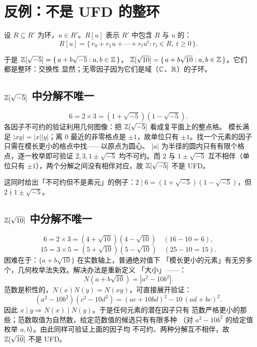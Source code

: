 \section{反例：不是 UFD 的整环}\label{sec:counter}

\begin{definition}[{环的生成 $R[u]$}]
设 $R\subseteq R'$ 为环，$u\in R'$。$R[u]$ 表示 $R'$ 中包含 $R$ 与 $u$
的：
\[
  R[u] = \{\, r_0 + r_1 u + \cdots + r_t u^t : r_i\in R,\ t\ge 0\,\}.
\]
\end{definition}

于是 $\mathbb{Z}[\sqrt{-5}] = \{\,a+b\sqrt{-5} : a,b\in\mathbb{Z}\,\}$，
$\mathbb{Z}[\sqrt{10}] = \{\,a+b\sqrt{10} : a,b\in\mathbb{Z}\,\}$。它们都是整环：交换性
显然；无零因子因为它们是域（$\mathbb{C}$、$\mathbb{R}$）的子环。

\subsection{\texorpdfstring{$\Z[\sqrt{-5}]$}{Z[√-5]} 中分解不唯一}

\begin{example}[{$\Z[\sqrt{-5}]$ 中分解不唯一}]
\[
  6 = 2\times 3 = (1+\sqrt{-5})(1-\sqrt{-5}).
\]
各因子不可约的验证利用几何图像：把 $\Z[\sqrt{-5}]$ 看成复平面上的整点格。
模长满足 $|xy| = |x||y|$；离 $0$ 最近的非零格点是 $\pm 1$，故单位只有
$\pm 1$。找一个元素的因子只需在模长更小的格点中找——以原点为圆心、
$|a|$ 为半径的圆内只有有限个格点，逐一枚举即可验证 $2, 3,
1\pm\sqrt{-5}$ 均不可约。而 $2$ 与 $1\pm\sqrt{-5}$ 互不相伴（单位只有
$\pm 1$），两个分解之间没有相伴对应，故 $\Z[\sqrt{-5}]$ 不是 UFD。
\end{example}

这同时给出「不可约但不是素元」的例子：$2\mid 6 =
(1+\sqrt{-5})(1-\sqrt{-5})$，但 $2\nmid 1\pm\sqrt{-5}$。

\subsection{\texorpdfstring{$\Z[\sqrt{10}]$}{Z[√10]} 中分解不唯一}

\begin{example}[{$\Z[\sqrt{10}]$ 中分解不唯一}]
\[
  6 = 2\times 3 = (4+\sqrt{10})(4-\sqrt{10})\quad (16-10=6),
\]
\[
  15 = 3\times 5 = (5+\sqrt{10})(5-\sqrt{10})\quad (25-10=15).
\]
困难在于：$\{a+b\sqrt{10}\}$ 在实数轴上，普通绝对值下
「模长更小的元素」有无穷多个，几何枚举法失效。解决办法是重新定义
「大小」——：
\[
  N(a+b\sqrt{10}) = |a^2 - 10b^2|.
\]
范数是积性的，$N(x)N(y) = N(xy)$，可直接展开验证：
\[
  (a^2-10b^2)(c^2-10d^2) = (ac+10bd)^2 - 10\,(ad+bc)^2.
\]
因此 $x\mid y \Rightarrow N(x)\mid N(y)$。于是任何元素的潜在因子只有
范数严格更小的那些；范数取值为自然数，给定范数值的候选只有有限多种
（对 $a^2 - 10b^2$ 的给定值枚举 $a,b$）。由此同样可验证上面的因子均
不可约、两种分解互不相伴，故 $\Z[\sqrt{10}]$ 不是 UFD。
\end{example}
